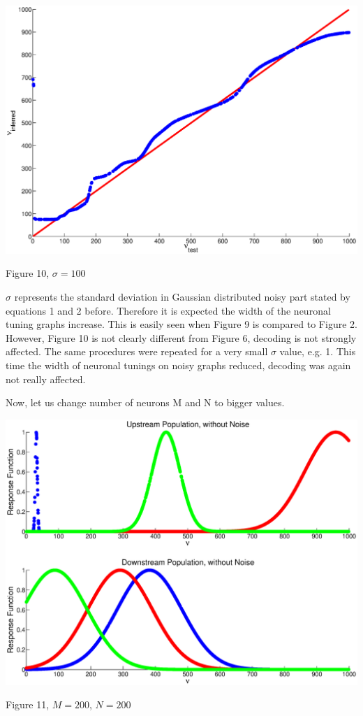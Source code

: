 \documentclass{article}
\begin{document}
\begin{center}
\includegraphics[width=\textwidth]{sigma_big2.eps}
\begin{footnotesize}
 Figure 10, $\sigma=100$
\end{footnotesize}
\end{center}

$\sigma$ represents the standard deviation in Gaussian distributed noisy part stated by equations 1 and 2 before. Therefore it is expected the width of the neuronal tuning graphs increase. This is easily seen when Figure 9 is compared to Figure 2. However, Figure 10 is not clearly different from Figure 6, decoding is not strongly affected. The same procedures were repeated for a very small $\sigma$ value, e.g. 1. This time the width of neuronal tunings on noisy graphs reduced, decoding was again not really affected. 

Now, let us change number of neurons M and N to bigger values.

\begin{center}
\includegraphics[width=\textwidth]{MN_big1.eps}
\begin{footnotesize}
 Figure 11, $M=200$, $N=200$
\end{footnotesize}
\end{center}
\end{document}
